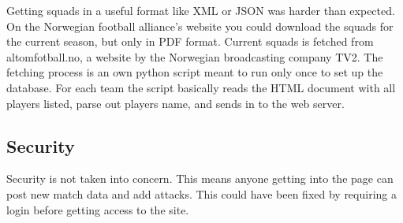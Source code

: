 Getting squads in a useful format like \ac{XML} or \ac{JSON} was harder than expected. On the Norwegian football alliance's website you could download the squads for the current season, but only in PDF format. Current squads is fetched from altomfotball.no, a website by the Norwegian broadcasting company TV2. The fetching process is an own python script meant to run only once to set up the database. For each team the script basically reads the HTML document with all players listed, parse out players name, and sends in to the web server.


\subsection{Security}
Security is not taken into concern. This means anyone getting into the page can post new match data and add attacks. This could have been fixed by requiring a login before getting access to the site. 







